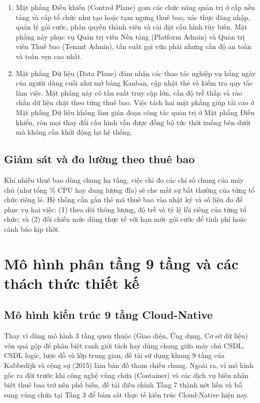 \begin{enumerate}
\def\labelenumi{\arabic{enumi}.}
\item
  Mặt phẳng Điều khiển (Control Plane) gom các chức năng quản trị ở cấp nền tảng và cấp tổ chức như tạo hoặc tạm ngưng thuê bao, xác thực đăng nhập, quản lý gói cước, phân quyền thành viên và cài đặt cấu hình tùy biến. Mặt phẳng này phục vụ Quản trị viên Nền tảng (Platform Admin) và Quản trị viên Thuê bao (Tenant Admin), tần suất gọi vừa phải nhưng cần độ an toàn và toàn vẹn cao nhất.
\item
  Mặt phẳng Dữ liệu (Data Plane) đảm nhận các thao tác nghiệp vụ hằng ngày của người dùng cuối như mở bảng Kanban, cập nhật thẻ và kiểm tra quy tắc làm việc. Mặt phẳng này có tần suất truy cập lớn, cần độ trễ thấp và rào chắn dữ liệu chặt theo từng thuê bao. Việc tách hai mặt phẳng giúp tải cao ở Mặt phẳng Dữ liệu không làm gián đoạn công tác quản trị ở Mặt phẳng Điều khiển, còn mọi thay đổi cấu hình vẫn được đồng bộ tức thời xuống bên dưới mà không cần khởi động lại hệ thống.
\end{enumerate}

\subsection{Giám sát và đo lường theo thuê bao}\label{v4-sec-1-4-5}

Khi nhiều thuê bao dùng chung hạ tầng, việc chỉ đo các chỉ số chung của máy chủ (như tổng \% CPU hay dung lượng đĩa) sẽ che mất sự bất thường của từng tổ chức riêng lẻ. Hệ thống cần gắn thẻ mã thuê bao vào nhật ký và số liệu đo để phục vụ hai việc: (1) theo dõi thông lượng, độ trễ và tỷ lệ lỗi riêng của từng tổ chức; và (2) đối chiếu mức dùng thực tế với hạn mức gói cước để tính phí hoặc cảnh báo kịp thời.

\section{Mô hình phân tầng 9 tầng và các thách thức thiết kế}\label{v4-sec-1-5}

\subsection{Mô hình kiến trúc 9 tầng Cloud-Native}\label{v4-sec-1-5-1}

Thay vì dùng mô hình 3 tầng quen thuộc (Giao diện, Ứng dụng, Cơ sở dữ liệu) vốn quá gộp để phân biệt ranh giới tách hay dùng chung giữa máy chủ CSDL, CSDL logic, lược đồ và lớp trung gian, đề tài sử dụng khung 9 tầng của Kabbedijk và cộng sự (2015) \cite{v4-05} làm bản đồ tham chiếu chung. Ngoài ra, vì mô hình gốc ra đời trước khi công nghệ vùng chứa (Container) và các dịch vụ biên nhận biết thuê bao trở nên phổ biến, đề tài điều chỉnh Tầng 7 thành nét liền và bổ sung vùng chứa tại Tầng 3 để bám sát thực tế kiến trúc Cloud-Native hiện nay.

